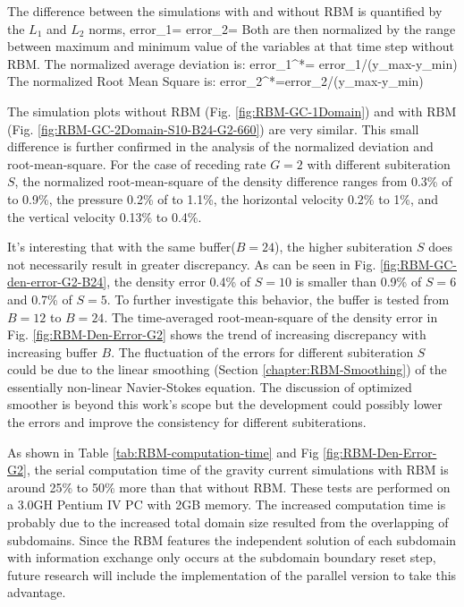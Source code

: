 The difference between the simulations with and without RBM is quantified by the $L_1$ and $L_2$ norms,
\be
error_1=
\ee
\be
error_2=
\ee
Both are then normalized by the range between maximum and minimum value of the variables at that time step without RBM. The normalized average deviation is:
\be
error_1^*= error_1/(y_{max}-y_{min})
\ee
The normalized Root Mean Square is:
\be
error_2^*=error_2/(y_{max}-y_{min})
\ee

The simulation plots without RBM (Fig. \ref{fig:RBM-GC-1Domain}) and with RBM (Fig. \ref{fig:RBM-GC-2Domain-S10-B24-G2-660}) are very similar. This small difference is further confirmed in the analysis of the normalized deviation and root-mean-square. For the case of receding rate $G=2$ with different subiteration $S$, the normalized root-mean-square of the density difference ranges from 0.3\% of to 0.9\%, the pressure 0.2\% of to 1.1\%, the horizontal velocity 0.2\% to 1\%, and the vertical velocity 0.13\% to 0.4\%.

It's interesting that with the same buffer($B=24$), the higher subiteration $S$ does not necessarily result in greater discrepancy. As can be seen in Fig. \ref{fig:RBM-GC-den-error-G2-B24}, the density error 0.4\% of $S=10$ is smaller than 0.9\% of $S=6$ and 0.7\% of $S=5$.
To further investigate this behavior, the buffer is tested from $B=12$ to $B=24$. The time-averaged root-mean-square of the density error in Fig. \ref{fig:RBM-Den-Error-G2} shows the trend of increasing discrepancy with increasing buffer $B$. The fluctuation of the errors for different subiteration $S$ could be due to the linear smoothing (Section \ref{chapter:RBM-Smoothing}) of the essentially non-linear Navier-Stokes equation. The discussion of optimized smoother is beyond this work's scope but the development could possibly lower the errors and improve the consistency for different subiterations.

As shown in Table \ref{tab:RBM-computation-time} and Fig \ref{fig:RBM-Den-Error-G2}, the serial computation time of the gravity current simulations with RBM is around 25\% to 50\% more than that without RBM. These tests are performed on a 3.0GH Pentium IV PC with 2GB memory. The increased computation time is probably due to the increased total domain size resulted from the overlapping of subdomains. Since the RBM features the independent solution of each subdomain with information exchange only occurs at the subdomain boundary reset step, future research will include the implementation of the parallel version to take this advantage.

